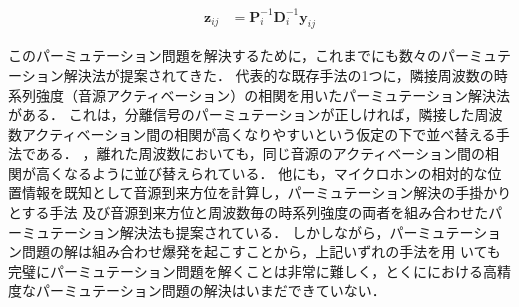 \begin{align}
\bm{z}_{ij} &= \bm{P}_{i}^{-1}\bm{D}_{i}^{-1}\bm{y}_{ij} \label{eq:z}
\end{align}

このパーミュテーション問題を解決するために，これまでにも数々のパーミュテーション解決法が提案されてきた．
代表的な既存手法の1つに，隣接周波数の時系列強度（音源アクティベーション）の相関を用いたパーミュテーション解決法がある．
これは，分離信号のパーミュテーションが正しければ，隣接した周波数アクティベーション間の相関が高くなりやすいという仮定の下で並べ替える手法である．
，離れた周波数においても，同じ音源のアクティベーション間の相関が高くなるように並び替えられている．
他にも，マイクロホンの相対的な位置情報を既知として音源到来方位を計算し，パーミュテーション解決の手掛かりとする手法 \cite{DOA}及び音源到来方位と周波数毎の時系列強度の両者を組み合わせたパーミュテーション解決法も提案されている．
しかしながら，パーミュテーション問題の解は組み合わせ爆発を起こすことから，上記いずれの手法を用
いても完璧にパーミュテーション問題を解くことは非常に難しく，とくににおける高精度なパーミュテーション問題の解決はいまだできていない．

